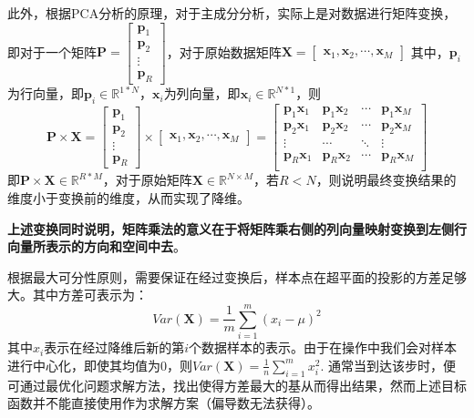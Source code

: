 \documentclass[12pt,a4paper]{article}
\begin{document}
  此外，根据PCA分析的原理，对于主成分分析，实际上是对数据进行矩阵变换，即对于一个矩阵$\mathbf{P}=\left[\begin{array}{c}
    \mathbf{p}_1 \\ 
    \mathbf{p}_2 \\ 
    \vdots \\ 
    \mathbf{p}_R
  \end{array}\right]$，对于原始数据矩阵$\mathbf{X}=\left[\begin{array}{cccc}
    \mathbf{x}_1, \mathbf{x}_2, \cdots, \mathbf{x}_M
  \end{array}\right]$
  其中，$\mathbf{p}_i$为行向量，即$\mathbf{p}_i \in \mathbb{R}^{1*N}$，$\mathbf{x}_i$为列向量，即$\mathbf{x}_i \in \mathbb{R}^{N*1}$，则
  $$
  \mathbf{P}\times \mathbf{X} = \left[\begin{array}{c}
    \mathbf{p}_1 \\ 
    \mathbf{p}_2 \\ 
    \vdots \\ 
    \mathbf{p}_R
  \end{array}\right] \times \left[\begin{array}{cccc}
    \mathbf{x}_1, \mathbf{x}_2, \cdots, \mathbf{x}_M
  \end{array}\right] = \left[\begin{array}{cccc}
    \mathbf{p}_1\mathbf{x}_1 & \mathbf{p}_1\mathbf{x}_2 & \cdots & \mathbf{p}_1\mathbf{x}_M \\ 
    \mathbf{p}_2\mathbf{x}_1 & \mathbf{p}_2\mathbf{x}_2 & \cdots & \mathbf{p}_2\mathbf{x}_M \\ 
    \vdots & \cdots & \ddots & \vdots \\ 
    \mathbf{p}_R\mathbf{x}_1 & \mathbf{p}_R\mathbf{x}_2 & \cdots & \mathbf{p}_R\mathbf{x}_M \\ 
  \end{array}\right]
  $$
  即$\mathbf{P}\times \mathbf{X} \in \mathbb{R}^{R*M}$，对于原始矩阵$\mathbf{X} \in \mathbb{R}^{N\times M}$，若$R < N$，则说明最终变换结果的维度小于变换前的维度，从而实现了降维。

  \textbf{上述变换同时说明，矩阵乘法的意义在于将矩阵乘右侧的列向量映射变换到左侧行向量所表示的方向和空间中去}。

  根据最大可分性原则，需要保证在经过变换后，样本点在超平面的投影的方差足够大。其中方差可表示为：
  $$
  Var(\mathbf{X})= \frac{1}{m} \sum\limits_{i=1}^m \left(x_i-\mu\right)^2
  $$
  其中$x_i$表示在经过降维后新的第$i$个数据样本的表示。由于在操作中我们会对样本进行中心化，即使其均值为0，则$Var(\mathbf{X})=\frac{1}{n}\sum\limits_{i=1}^m x_i^2$. 通常当到达该步时，便可通过最优化问题求解方法，找出使得方差最大的基从而得出结果，然而上述目标函数并不能直接使用作为求解方案（偏导数无法获得）。
\end{document}
